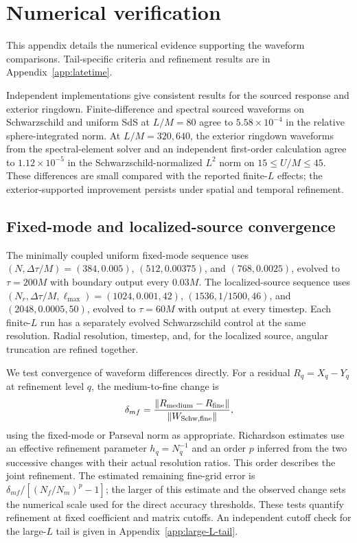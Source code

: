 \documentclass[
 aps,
 prd,
 reprint,
 superscriptaddress,
 nofootinbib,
 longbibliography
]{revtex4-2}
\begin{document}
\appendix

\section{Numerical verification}
\label{app:convergence}

This appendix details the numerical evidence supporting the waveform
comparisons.  Tail-specific criteria and refinement results are 
in Appendix~\ref{app:latetime}.

Independent implementations give consistent results for the sourced response
and exterior ringdown.  Finite-difference and spectral sourced waveforms on
Schwarzschild and uniform SdS at $L/M=80$ agree to $5.58\times10^{-4}$
in the relative sphere-integrated norm.  At $L/M=320,640$, the exterior
ringdown waveforms from the spectral-element solver and an independent
first-order calculation agree to $1.12\times10^{-5}$ in the
Schwarzschild-normalized $L^2$ norm on $15\leq U/M\leq45$.
These differences are small compared with the reported finite-$L$ effects;
the exterior-supported improvement persists under spatial and temporal
refinement.

\subsection{Fixed-mode and localized-source convergence}

The minimally coupled uniform fixed-mode sequence uses
$(N,\Delta\tau/M)=(384,0.005)$, $(512,0.00375)$, and $(768,0.0025)$,
evolved to $\tau=200M$ with boundary output every $0.03M$.  The
localized-source sequence uses
$(N_r,\Delta\tau/M,\ell_{\max})=(1024,0.001,42)$,
$(1536,1/1500,46)$, and $(2048,0.0005,50)$, evolved to $\tau=60M$
with output at every timestep.  Each finite-$L$ run has a separately
evolved Schwarzschild control at the same resolution.  Radial resolution,
timestep, and, for the localized source, angular truncation are refined
together.

We test convergence of waveform differences directly.  For a residual
$R_q=X_q-Y_q$ at refinement level $q$, the medium-to-fine change is
\begin{equation}
 \delta_{mf}=
 \frac{\|R_{\rm medium}-R_{\rm fine}\|}
 {\|W_{{\rm Schw},{\rm fine}}\|},
 \label{eq:paired_refinement_change}
\end{equation}
using the fixed-mode or Parseval norm as appropriate. Richardson estimates use an effective refinement
parameter $h_q=N_q^{-1}$ and an order $p$ inferred from the two successive
changes with their actual resolution ratios.  This order describes the
joint refinement.  The estimated remaining fine-grid error is
$\delta_{mf}/[(N_f/N_m)^p-1]$; the larger of this estimate and the observed
change sets the numerical scale used for the direct accuracy thresholds.
These tests quantify refinement at fixed coefficient and matrix cutoffs.
An independent cutoff check for the large-$L$ tail is given in
Appendix~\ref{app:large-L-tail}.
\end{document}
